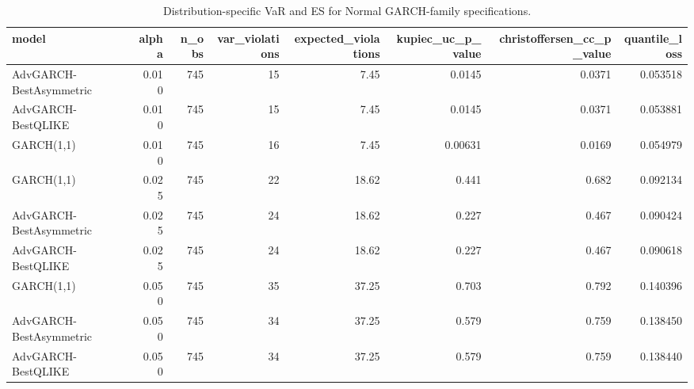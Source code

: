 \begin{table}[!t]
\centering
\caption{Distribution-specific VaR and ES for Normal GARCH-family specifications.}
\label{tab:model-specific-var-es-garch}
\scriptsize
\begin{tabular}{@{}lrrrrrrr@{}}
\toprule
model & alpha & n\_obs & var\_violations & expected\_violations & kupiec\_uc\_p\_value & christoffersen\_cc\_p\_value & quantile\_loss \\
\midrule
AdvGARCH-BestAsymmetric & 0.010 & 745 & 15 & 7.45 & 0.0145 & 0.0371 & 0.053518 \\
AdvGARCH-BestQLIKE & 0.010 & 745 & 15 & 7.45 & 0.0145 & 0.0371 & 0.053881 \\
GARCH(1,1) & 0.010 & 745 & 16 & 7.45 & 0.00631 & 0.0169 & 0.054979 \\
GARCH(1,1) & 0.025 & 745 & 22 & 18.62 & 0.441 & 0.682 & 0.092134 \\
AdvGARCH-BestAsymmetric & 0.025 & 745 & 24 & 18.62 & 0.227 & 0.467 & 0.090424 \\
AdvGARCH-BestQLIKE & 0.025 & 745 & 24 & 18.62 & 0.227 & 0.467 & 0.090618 \\
GARCH(1,1) & 0.050 & 745 & 35 & 37.25 & 0.703 & 0.792 & 0.140396 \\
AdvGARCH-BestAsymmetric & 0.050 & 745 & 34 & 37.25 & 0.579 & 0.759 & 0.138450 \\
AdvGARCH-BestQLIKE & 0.050 & 745 & 34 & 37.25 & 0.579 & 0.759 & 0.138440 \\
\bottomrule
\end{tabular}
\end{table}
